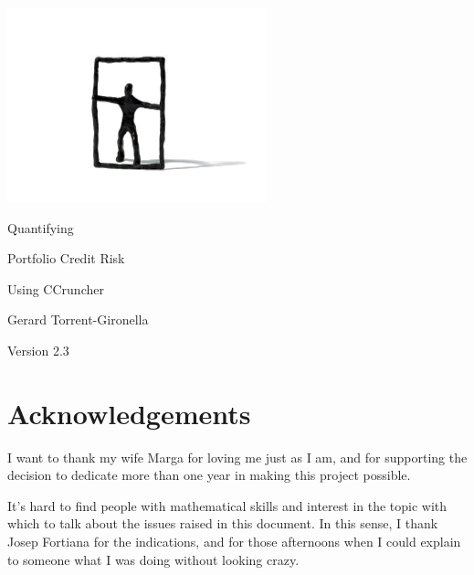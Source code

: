 \documentclass[11pt,fleqn]{book} %
\def\numversion{2.3}
\begin{document}
\begingroup
\thispagestyle{empty}
\vspace*{-2.5cm}
\centerline{\includegraphics[angle=0]{./Pictures/logo.png}}
\centering
\vspace*{0.5cm}
\par\normalfont\fontsize{35}{55}\sffamily\selectfont
Quantifying\par 
Portfolio Credit Risk\par
Using CCruncher\par
\vspace*{2cm}
{\huge Gerard Torrent-Gironella}\par
\vspace*{2cm}
\par\normalfont\fontsize{14}{14}\sffamily\selectfont
Version \numversion\par
\endgroup


\newpage

\section*{Acknowledgements}
I want to thank my wife Marga for loving me just as I am, and for supporting 
the decision to dedicate more than one year in making this project possible.

It's hard to find people with mathematical skills and interest in the topic 
with which to talk about the issues raised in this document. In this sense, 
I thank Josep Fortiana for the indications, and for those afternoons when I 
could explain to someone what I was doing without looking crazy.
\end{document}
